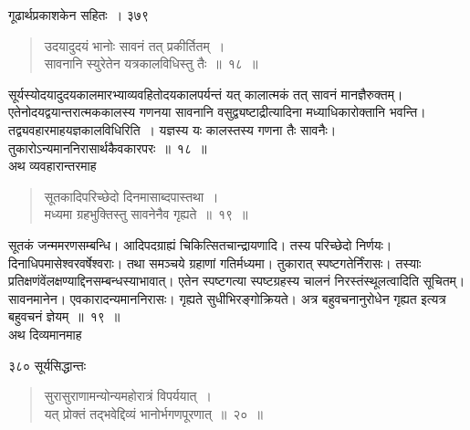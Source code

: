 \documentclass[11pt, openany]{book}
\begin{document}
\newpage


\hspace{3cm} गूढार्थप्रकाशकेन सहितः~। \hfill ३७९
\vspace{1cm}


\begin{quote}
 {\ssi उदयादुदयं भानोः सावनं तत् प्रकीर्तितम्~।\\
सावनानि स्युरेतेन यत्रकालविधिस्तु तैः~॥~१८~॥ }
\end{quote}

 सूर्यस्योदयादुदयकालमारभ्याव्यवहितोदयकालपर्यन्तं यत्
कालात्मकं तत् सावनं मानज्ञैरुक्तम्। एतेनोदयद्वयान्तरात्मककालस्य गणनया सावनानि वसुद्व्यष्टाद्रीत्यादिना मध्याधिकारोक्तानि भवन्ति। तद्व्यवहारमाह\textendash यज्ञकालविधिरिति~। यज्ञस्य यः कालस्तस्य गणना तैः सावनैः। तुकारोऽन्यमाननिरासार्थकैवकारपरः~॥~१८~॥\\ 
\noindent अथ व्यवहारान्तरमाह \textendash


\begin{quote}
 {\ssi सूतकादिपरिच्छेदो दिनमासाब्दपास्तथा~।\\
मध्यमा ग्रहभुक्तिस्तु सावनेनैव गृह्यते~॥~१९~॥}
\end{quote}
 सूतकं जन्ममरणसम्बन्धि। आदिपदग्राह्यं चिकित्सितचान्द्रायणादि। तस्य परिच्छेदो निर्णयः। दिनाधिपमासेश्वरवर्षेश्वराः। तथा समञ्चये ग्रहाणां गतिर्मध्यमा। तुकारात् स्पष्टगतेर्निंरासः। तस्याः प्रतिक्षणंवेंलक्षण्याद्दिनसम्बन्धस्याभावात्। एतेन स्पष्टगत्या स्पष्टग्रहस्य चालनं निरस्तंस्थूलत्वादिति सूचितम्। सावनमानेन। एवकारादन्यमाननिरासः। गृह्यते सुधीभिरङ्गोक्रियते। अत्र बहुवचनानुरोधेन गृह्यत इत्यत्र बहुवचनं ज्ञेयम्~॥~१९~॥\\
\noindent अथ दिव्यमानमाह \textendash


\newpage


\noindent ३८० \hspace{4cm} सूर्यसिद्धान्तः 
\vspace{1cm}


\begin{quote}
{\ssi सुरासुराणामन्योन्यमहोरात्रं विपर्ययात्~।\\
यत् प्रोक्तं तद्भवेद्दिव्यं भानोर्भगणपूरणात्~॥~२०~॥ }
\end{quote}
\end{document}
